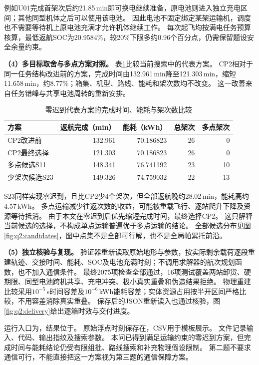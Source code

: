 例如U01完成首架次后约21.85\,min即可换电继续准备，原电池则进入独立充电区间；其他同型机体之后可以使用该电池。
因此电池不固定绑定某架运输机，调度也不需要等待机上原电池充满才允许机体继续工作。
每次起飞均按满电任务预算核算，最低返航SOC为20.9584\%，较20\%下限多约0.96个百分点，仍需保留题设安全余量约束。

\textbf{（4）多目标取舍与多点方案对照。}
表\ref{tab:q2:comparison}比较当前搜索中的代表方案。
CP2相对于同一任务结构改进前的方案，完成时间由132.961\,min降至121.303\,min，缩短11.658\,min，约8.77\%；箱集、机型、路线、能耗和架次数均不改变。
这一改善来自任务错峰与共享电池周转的重新安排。

\begin{table}[htbp]
  \centering
  \caption{零迟到代表方案的完成时间、能耗与架次数比较}
  \label{tab:q2:comparison}
  \begin{tabular}{lrrrr}
    \toprule
    方案 & 返航完成（min） & 能耗（kWh） & 总架次 & 多点架次 \\
    \midrule
    CP2改进前 & 132.961 & 70.186823 & 26 & 0 \\
    CP2最终选择 & 121.303 & 70.186823 & 26 & 0 \\
    多点候选S11 & 148.341 & 76.741192 & 23 & 10 \\
    少架次候选S23 & 149.326 & 74.759032 & 22 & 13 \\
    \bottomrule
  \end{tabular}
\end{table}

S23同样实现零迟到，且比CP2少4个架次，但全部返航晚约28.02\,min，能耗高约4.57\,kWh。
多点运输减少往返次数的收益，可能被重载飞行、逐站爬升下降及资源等待抵消。
由于本文在零迟到后优先缩短完成时间，最终选择CP2。
这只解释当前候选的选择，不构成单点运输普遍优于多点运输的结论。
全部候选分布见图\ref{fig:q2:candidates}，图中点集不是全部可行解，也不是全局帕累托前沿。

\textbf{（5）独立核验与复现。}
验证器重新读取原始地形与参数，按实际剩余载荷逐段重建轨迹、交接时间、能耗、SOC及电池充满时刻；不调用求解器的航次规划函数，也不加入通信条件。
最终2075项检查全部通过，16项测试覆盖两站卸货、硬期限、同型电池跨机共享、充电冲突、极小真实重叠和伪造结果拒绝。
物理重建比较采用$10^{-5}$\,s时间容差及$10^{-6}$\,kWh能耗容差；实体资源占用按半开区间严格比较，不用容差消除真实重叠。
保存后的JSON重新读入也通过核验，图\ref{fig:q2:delivery}给出逐箱时效与交付进度。

运行入口为，结果位于。
原始浮点时刻保存在，CSV用于模板展示。
文件记录输入、代码、输出指纹及搜索参数。
本问已得到满足运输约束的零迟到方案，但完成时间与能耗结论仍受有限组批、路线搜索和补充物理假设限制。
第二题不要求通信可行，不能直接把这一方案视为第三题的通信保障方案。

